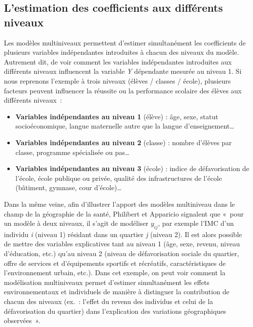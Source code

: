 \documentclass[
  11pt,
  french,
]{book}
\providecommand{\tightlist}{%
  \setlength{\itemsep}{0pt}\setlength{\parskip}{0pt}}
\begin{document}
\hypertarget{sect0812}{%
\subsection{L'estimation des coefficients aux différents niveaux}\label{sect0812}}

Les modèles multiniveaux permettent d'estimer simultanément les coefficients de plusieurs variables indépendantes introduites à chacun des niveaux du modèle. Autrement dit, de voir comment les variables indépendantes introduites aux différents niveaux influencent la variable \emph{Y} dépendante mesurée au niveau 1. Si nous reprenons l'exemple à trois niveaux (élèves / classes / école), plusieurs facteurs peuvent influencer la réussite ou la performance scolaire des élèves aux différents niveaux~:

\begin{itemize}
\tightlist
\item
  \textbf{Variables indépendantes au niveau 1} (élève) : âge, sexe, statut socioéconomique, langue maternelle autre que la langue d'enseignement\ldots{}
\item
  \textbf{Variables indépendantes au niveau 2} (classe) : nombre d'élèves par classe, programme spécialisée ou pas\ldots{}
\item
  \textbf{Variables indépendantes au niveau 3} (école) : indice de défavorisation de l'école, école publique ou privée, qualité des infrastructures de l'école (bâtiment, gymnase, cour d'école)\ldots{}
\end{itemize}

Dans la même veine, afin d'illustrer l'apport des modèles multiniveau dans le champ de la géographie de la santé, Philibert et Apparicio \citeyearpar[p.~129]{philibert2007statistiques} signalent que «~pour un modèle à deux niveaux, il s'agit de modéliser \(y_{ij}\), par exemple l'IMC d'un individu \emph{i} (niveau 1) résidant dans un quartier \emph{j} (niveau 2). Il est alors possible de mettre des variables explicatives tant au niveau 1 (âge, sexe, revenu, niveau d'éducation, etc.) qu'au niveau 2 (niveau de défavorisation sociale du quartier, offre de services et d'équipements sportifs et récréatifs, caractéristiques de l'environnement urbain, etc.). Dans cet exemple, on peut voir comment la modélisation multiniveaux permet d'estimer simultanément les effets environnementaux et individuels de manière à distinguer la contribution de chacun des niveaux (ex.~: l'effet du revenu des individus et celui de la défavorisation du quartier) dans l'explication des variations géographiques observées~».
\end{document}
